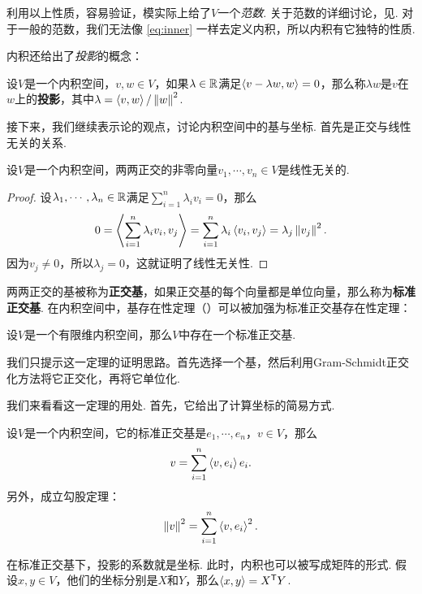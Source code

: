 利用以上性质，容易验证，模实际上给了$V$一个\emph{范数}. 关于范数的详细讨论，见. 对于一般的范数，我们无法像 \eqref{eq:inner} 一样去定义内积，所以内积有它独特的性质. 

内积还给出了\emph{投影}的概念：

\begin{definition}[投影]
设$V$是一个内积空间，$v,w\in V$，如果$\lambda\in\mathbb{R}$满足$\left\langle{v-\lambda w},{w}\right\rangle=0$，那么称$\lambda w$是$v$在$w$上的\textbf{投影}，其中$\lambda=\left\langle{v},{w}\right\rangle/\left\|w\right\|^2$.
\end{definition}

接下来，我们继续表示论的观点，讨论内积空间中的基与坐标. 首先是正交与线性无关的关系. 

\begin{proposition}\label{prop:orthogonal}
设$V$是一个内积空间，两两正交的非零向量$v_1,\cdots,v_n\in V$是线性无关的. 
\end{proposition}
\begin{proof}
设$\lambda_1,\cdots,\lambda_n\in\mathbb{R}$满足$\sum_{i=1}^n\lambda_iv_i=0$，那么
\[
    0=\left\langle{\sum_{i=1}^n\lambda_iv_i},{v_j}\right\rangle=\sum_{i=1}^n\lambda_i\left\langle{v_i},{v_j}\right\rangle=\lambda_j\left\|v_j\right\|^2.
\]
因为$v_j\neq 0$，所以$\lambda_j=0$，这就证明了线性无关性. 
\end{proof}

两两正交的基被称为\textbf{正交基}，如果正交基的每个向量都是单位向量，那么称为\textbf{标准正交基}. 在内积空间中，基存在性定理（）可以被加强为标准正交基存在性定理：

\begin{theorem}[标准正交基存在性定理]\label{thm:orthogonal-basis}
设$V$是一个有限维内积空间，那么$V$中存在一个标准正交基. 
\end{theorem}

我们只提示这一定理的证明思路。首先选择一个基，然后利用Gram-Schmidt正交化方法将它正交化，再将它单位化. 

我们来看看这一定理的用处. 首先，它给出了计算坐标的简易方式. 

\begin{proposition}\label{prop:projection}
设$V$是一个内积空间，它的标准正交基是$e_1,\cdots,e_n$，$v\in V$，那么
\[
    v=\sum_{i=1}^n\left\langle{v},{e_i}\right\rangle e_i.
\]
另外，成立勾股定理：
\[
    \left\|v\right\|^2=\sum_{i=1}^n\left\langle{v},{e_i}\right\rangle^2.
\]
\end{proposition}

在标准正交基下，投影的系数就是坐标. 此时，内积也可以被写成矩阵的形式. 假设$x,y\in V$，他们的坐标分别是$X$和$Y$，那么$\left\langle{x},{y}\right\rangle=X^{\mathsf{T}} Y$.

